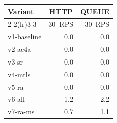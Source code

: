 \begin{tabular}{lrr}
\toprule
Variant & \multicolumn{1}{c}{HTTP} & \multicolumn{1}{c}{QUEUE} \\
\cmidrule(lr){2-2}\cmidrule(lr){3-3}
 & 30~RPS & 30~RPS \\
\midrule
v1-baseline & 0.0 & 0.0 \\
v2-ac4a & 0.0 & 0.0 \\
v3-sr & 0.0 & 0.0 \\
v4-mtls & 0.0 & 0.0 \\
v5-ra & 0.0 & 0.0 \\
v6-all & 1.2 & 2.2 \\
v7-ra-ms & 0.7 & 1.1 \\
\bottomrule
\end{tabular}